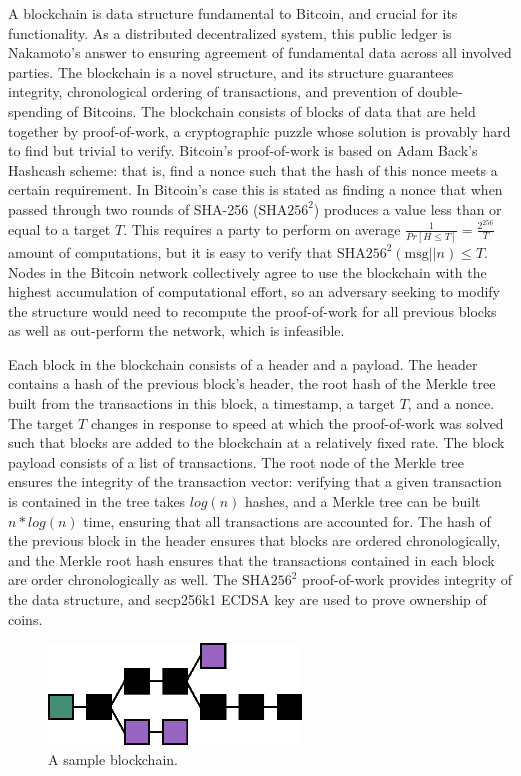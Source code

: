 A blockchain is data structure fundamental to Bitcoin, and crucial for its functionality. As a distributed decentralized system, this public ledger is Nakamoto's answer to ensuring agreement of fundamental data across all involved parties. The blockchain is a novel structure, and its structure guarantees integrity, chronological ordering of transactions, and prevention of double-spending of Bitcoins. The blockchain consists of blocks of data that are held together by proof-of-work, a cryptographic puzzle whose solution is provably hard to find but trivial to verify. Bitcoin's proof-of-work is based on Adam Back's Hashcash scheme: that is, find a nonce such that the hash of this nonce meets a certain requirement. In Bitcoin's case this is stated as finding a nonce that when passed through two rounds of SHA-256 ($ \textrm{SHA}256^{{2}} $) produces a value less than or equal to a target $ T $. This requires a party to perform on average $ \frac{1}{Pr[H \leq T]} = \frac{2 ^ {{256}}}{T} $ amount of computations, but it is easy to verify that $ \textrm{SHA}256^{{2}}(\textrm{msg} || n) \leq T $. Nodes in the Bitcoin network collectively agree to use the blockchain with the highest accumulation of computational effort, so an adversary seeking to modify the structure would need to recompute the proof-of-work for all previous blocks as well as out-perform the network, which is infeasible.\cite{Okupski2014}

Each block in the blockchain consists of a header and a payload. The header contains a hash of the previous block's header, the root hash of the Merkle tree built from the transactions in this block, a timestamp, a target $ T $, and a nonce. The target $ T $ changes in response to speed at which the proof-of-work was solved such that blocks are added to the blockchain at a relatively fixed rate. The block payload consists of a list of transactions. The root node of the Merkle tree ensures the integrity of the transaction vector: verifying that a given transaction is contained in the tree takes $ log(n) $ hashes, and a Merkle tree can be built $ n * log(n) $ time, ensuring that all transactions are accounted for. The hash of the previous block in the header ensures that blocks are ordered chronologically, and the Merkle root hash ensures that the transactions contained in each block are order chronologically as well. The $ \textrm{SHA}256^{{2}} $ proof-of-work provides integrity of the data structure, and secp256k1 ECDSA key are used to prove ownership of coins.\cite{Okupski2014}

\begin{figure}[htbp]
	\centering
	\includegraphics[width=0.6\textwidth]{images/Blockchain-2.eps}
	\caption{A sample blockchain.}
	\label{fig:figure1}
\end{figure}

